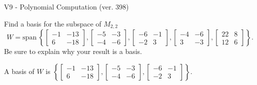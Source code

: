 \begin{exercise}
  \begin{exerciseTitle}V9 - Polynomial Computation (ver. 398)\end{exerciseTitle}
  \begin{exerciseStatement}
    Find a basis for the subspace of \(M_{2,2}\) 
\[W=\mathrm{span}\ \left\{\left[\begin{array}{cc}
-1 & -13 \\
6 & -18
\end{array}\right] , \left[\begin{array}{cc}
-5 & -3 \\
-4 & -6
\end{array}\right] , \left[\begin{array}{cc}
-6 & -1 \\
-2 & 3
\end{array}\right] , \left[\begin{array}{cc}
-4 & -6 \\
3 & -3
\end{array}\right] , \left[\begin{array}{cc}
22 & 8 \\
12 & 6
\end{array}\right]\right\}.\]
 Be sure to explain why your result is a basis.


  \end{exerciseStatement}
  \begin{exerciseAnswer}
   A basis of \(W\) is  \(\left\{\left[\begin{array}{cc}
-1 & -13 \\
6 & -18
\end{array}\right] , \left[\begin{array}{cc}
-5 & -3 \\
-4 & -6
\end{array}\right] , \left[\begin{array}{cc}
-6 & -1 \\
-2 & 3
\end{array}\right]\right\}\).
  


  \end{exerciseAnswer}
\end{exercise}